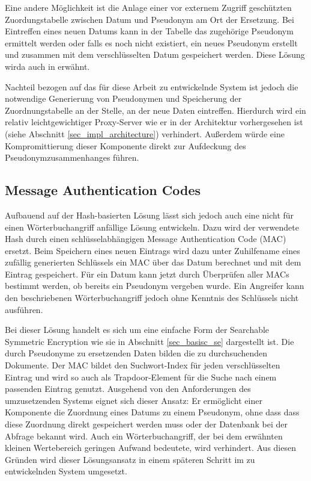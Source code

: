 Eine andere Möglichkeit ist die Anlage einer vor externem Zugriff geschützten Zuordungstabelle zwischen Datum und Pseudonym am Ort der Ersetzung. Bei Eintreffen eines neuen Datums kann in der Tabelle das zugehörige Pseudonym ermittelt werden oder falls es noch nicht existiert, ein neues Pseudonym erstellt und zusammen mit dem verschlüsselten Datum gespeichert werden. Diese Lösung wirda auch in \cite{goh2003} erwähnt.

Nachteil bezogen auf das für diese Arbeit zu entwickelnde System ist jedoch die notwendige Generierung von Pseudonymen und Speicherung der Zuordnungstabelle an der Stelle, an der neue Daten eintreffen. Hierdurch wird ein relativ leichtgewichtiger Proxy-Server wie er in der Architektur vorhergesehen ist (siehe Abschnitt \ref{sec_impl_architecture}) verhindert. Außerdem würde eine Kompromittierung dieser Komponente direkt zur Aufdeckung des Pseudonymzusammenhanges führen. 

\subsection{Message Authentication Codes}

Aufbauend auf der Hash-basierten Lösung lässt sich jedoch auch eine nicht für einen Wörterbuchangriff anfällige Lösung entwickeln. Dazu wird der verwendete Hash durch einen schlüsselabhängigen Message Authentication Code (MAC) ersetzt. Beim Speichern eines neuen Eintrags wird dazu unter Zuhilfename eines zufällig generierten Schlüssels ein MAC über das Datum berechnet und mit dem Eintrag gespeichert. Für ein Datum kann jetzt durch Überprüfen aller MACs bestimmt werden, ob bereits ein Pseudonym vergeben wurde. Ein Angreifer kann den beschriebenen Wörterbuchangriff jedoch ohne Kenntnis des Schlüssels nicht ausführen.

Bei dieser Lösung handelt es sich um eine einfache Form der Searchable Symmetric Encryption wie sie in Abschnitt \ref{sec_basisc_se} dargestellt ist. Die durch Pseudonyme zu ersetzenden Daten bilden die zu durchsuchenden Dokumente. Der MAC bildet den Suchwort-Index für jeden verschlüsselten Eintrag und wird so auch als Trapdoor-Element für die Suche nach einem passenden Eintrag genutzt. Ausgehend von den Anforderungen des umzusetzenden Systems eignet sich dieser Ansatz: Er ermöglicht einer Komponente die Zuordnung eines Datums zu einem Pseudonym, ohne dass dass diese Zuordnung direkt gespeichert werden muss oder der Datenbank bei der Abfrage bekannt wird. Auch ein Wörterbuchangriff, der bei dem erwähnten kleinen Wertebereich geringen Aufwand bedeutete, wird verhindert. Aus diesen Gründen wird dieser Lösungsansatz in einem späteren Schritt im zu entwickelnden System umgesetzt.

